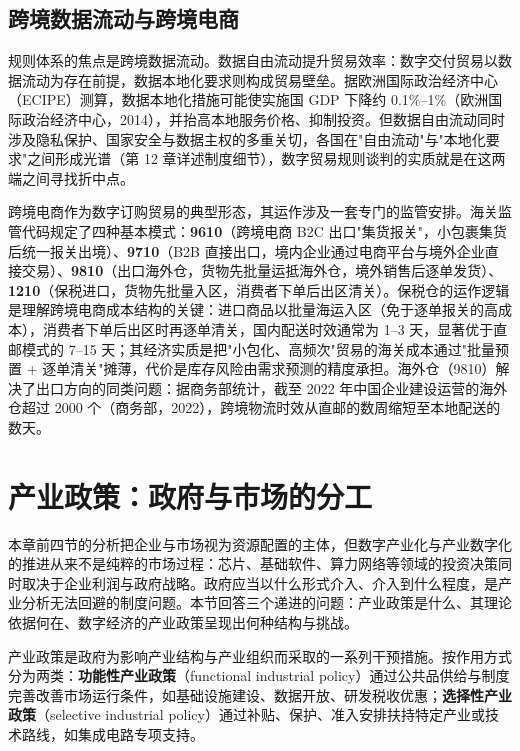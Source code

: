 \subsection{跨境数据流动与跨境电商}

规则体系的焦点是跨境数据流动。数据自由流动提升贸易效率：数字交付贸易以数据流动为存在前提，数据本地化要求则构成贸易壁垒。据欧洲国际政治经济中心（ECIPE）测算，数据本地化措施可能使实施国 GDP 下降约 0.1\%--1\%（欧洲国际政治经济中心，2014），并抬高本地服务价格、抑制投资。但数据自由流动同时涉及隐私保护、国家安全与数据主权的多重关切，各国在"自由流动"与"本地化要求"之间形成光谱（第 12 章详述制度细节），数字贸易规则谈判的实质就是在这两端之间寻找折中点。

跨境电商作为数字订购贸易的典型形态，其运作涉及一套专门的监管安排。海关监管代码规定了四种基本模式：\textbf{9610}（跨境电商 B2C 出口"集货报关"，小包裹集货后统一报关出境）、\textbf{9710}（B2B 直接出口，境内企业通过电商平台与境外企业直接交易）、\textbf{9810}（出口海外仓，货物先批量运抵海外仓，境外销售后逐单发货）、\textbf{1210}（保税进口，货物先批量入区，消费者下单后出区清关）。保税仓的运作逻辑是理解跨境电商成本结构的关键：进口商品以批量海运入区（免于逐单报关的高成本），消费者下单后出区时再逐单清关，国内配送时效通常为 1--3 天，显著优于直邮模式的 7--15 天；其经济实质是把"小包化、高频次"贸易的海关成本通过"批量预置 + 逐单清关"摊薄，代价是库存风险由需求预测的精度承担。海外仓（9810）解决了出口方向的同类问题：据商务部统计，截至 2022 年中国企业建设运营的海外仓超过 2000 个（商务部，2022），跨境物流时效从直邮的数周缩短至本地配送的数天。

\section{产业政策：政府与市场的分工}

本章前四节的分析把企业与市场视为资源配置的主体，但数字产业化与产业数字化的推进从来不是纯粹的市场过程：芯片、基础软件、算力网络等领域的投资决策同时取决于企业利润与政府战略。政府应当以什么形式介入、介入到什么程度，是产业分析无法回避的制度问题。本节回答三个递进的问题：产业政策是什么、其理论依据何在、数字经济的产业政策呈现出何种结构与挑战。

\begin{definition}
产业政策是政府为影响产业结构与产业组织而采取的一系列干预措施。按作用方式分为两类：\textbf{功能性产业政策}（functional industrial policy）通过公共品供给与制度完善改善市场运行条件，如基础设施建设、数据开放、研发税收优惠；\textbf{选择性产业政策}（selective industrial policy）通过补贴、保护、准入安排扶持特定产业或技术路线，如集成电路专项支持。
\end{definition}

